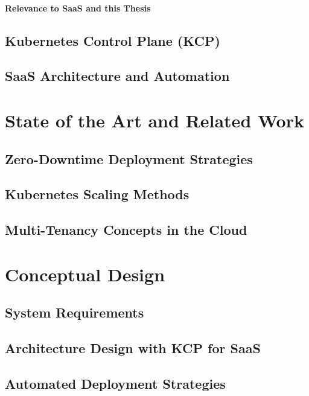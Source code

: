\documentclass[11pt, a4paper, oneside, draft]{scrartcl}
\begin{document}
            \paragraph{Relevance to SaaS and this Thesis}

        \subsection{Kubernetes Control Plane (KCP)}

        \subsection{SaaS Architecture and Automation}

    \section{State of the Art and Related Work}

        \subsection{Zero-Downtime Deployment Strategies}

        \subsection{Kubernetes Scaling Methods}

        \subsection{Multi-Tenancy Concepts in the Cloud}

    \section{Conceptual Design}

        \subsection{System Requirements}

        \subsection{Architecture Design with KCP for SaaS}

        \subsection{Automated Deployment Strategies}
\end{document}
